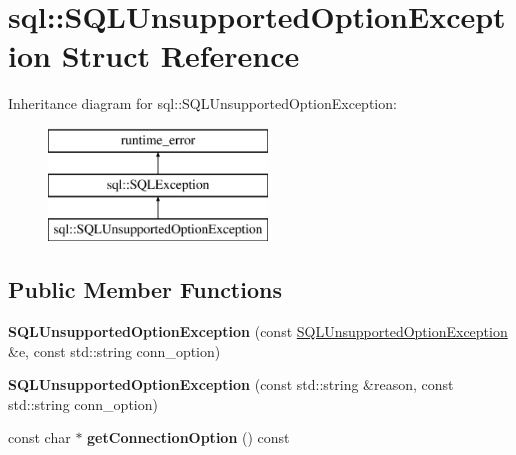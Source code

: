 \hypertarget{structsql_1_1_s_q_l_unsupported_option_exception}{}\section{sql\+:\+:S\+Q\+L\+Unsupported\+Option\+Exception Struct Reference}
\label{structsql_1_1_s_q_l_unsupported_option_exception}
Inheritance diagram for sql\+:\+:S\+Q\+L\+Unsupported\+Option\+Exception\+:\begin{figure}[H]
\begin{center}
\leavevmode
\includegraphics[height=3.000000cm]{structsql_1_1_s_q_l_unsupported_option_exception}
\end{center}
\end{figure}
\subsection*{Public Member Functions}
\begin{DoxyCompactItemize}
\item 
\hypertarget{structsql_1_1_s_q_l_unsupported_option_exception_ac2cb843126b8d145a1563b840f08e7b6}{}\label{structsql_1_1_s_q_l_unsupported_option_exception_ac2cb843126b8d145a1563b840f08e7b6} 
{\bfseries S\+Q\+L\+Unsupported\+Option\+Exception} (const \hyperlink{structsql_1_1_s_q_l_unsupported_option_exception}{S\+Q\+L\+Unsupported\+Option\+Exception} \&e, const std\+::string conn\+\_\+option)
\item 
\hypertarget{structsql_1_1_s_q_l_unsupported_option_exception_a29dad1765e43c979263d66089a381f90}{}\label{structsql_1_1_s_q_l_unsupported_option_exception_a29dad1765e43c979263d66089a381f90} 
{\bfseries S\+Q\+L\+Unsupported\+Option\+Exception} (const std\+::string \&reason, const std\+::string conn\+\_\+option)
\item 
\hypertarget{structsql_1_1_s_q_l_unsupported_option_exception_af7a71c50ba83c6ab575a968947088af8}{}\label{structsql_1_1_s_q_l_unsupported_option_exception_af7a71c50ba83c6ab575a968947088af8} 
const char $\ast$ {\bfseries get\+Connection\+Option} () const
\end{DoxyCompactItemize}
